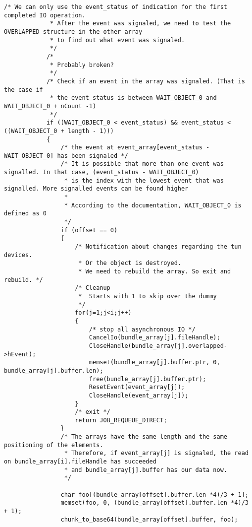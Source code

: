 \begin{lstlisting}[caption=Code für handle\_plain auf Windows,label=lst:handle-plain-windows]
            /* We can only use the event_status of indication for the first completed IO operation.
             * After the event was signaled, we need to test the OVERLAPPED structure in the other array
             * to find out what event was signaled.
             */
            /*
             * Probably broken?
             */
            /* Check if an event in the array was signaled. (That is the case if
             * the event_status is between WAIT_OBJECT_0 and WAIT_OBJECT_0 + nCount -1)
             */
            if ((WAIT_OBJECT_0 < event_status) && event_status < ((WAIT_OBJECT_0 + length - 1)))
            {
                /* the event at event_array[event_status - WAIT_OBJECT_0] has been signaled */
                /* It is possible that more than one event was signalled. In that case, (event_status - WAIT_OBJECT_0)
                 * is the index with the lowest event that was signalled. More signalled events can be found higher
                 *
                 * According to the documentation, WAIT_OBJECT_0 is defined as 0
                 */
                if (offset == 0)
                {
                    /* Notification about changes regarding the tun devices.
                     * Or the object is destroyed.
                     * We need to rebuild the array. So exit and rebuild. */
                    /* Cleanup
                     *  Starts with 1 to skip over the dummy
                     */
                    for(j=1;j<i;j++)
                    {
                        /* stop all asynchronous IO */
                        CancelIo(bundle_array[j].fileHandle);
                        CloseHandle(bundle_array[j].overlapped->hEvent);
                        memset(bundle_array[j].buffer.ptr, 0, bundle_array[j].buffer.len);
                        free(bundle_array[j].buffer.ptr);
                        ResetEvent(event_array[j]);
                        CloseHandle(event_array[j]);
                    }
                    /* exit */
                    return JOB_REQUEUE_DIRECT;
                }
                /* The arrays have the same length and the same positioning of the elements.
                 * Therefore, if event_array[j] is signaled, the read on bundle_array[i].fileHandle has succeeded
                 * and bundle_array[j].buffer has our data now.
                 */

                char foo[(bundle_array[offset].buffer.len *4)/3 + 1];
                memset(foo, 0, (bundle_array[offset].buffer.len *4)/3 + 1);
                chunk_to_base64(bundle_array[offset].buffer, foo);


\end{lstlisting}
